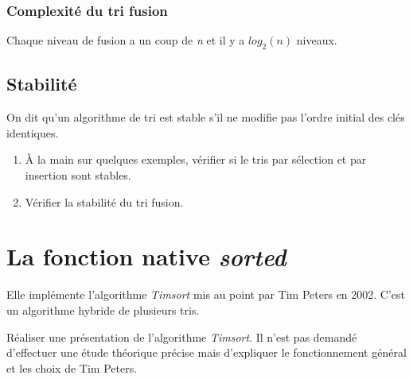 \documentclass[a4paper,11pt]{article}
\begin{document}
\begin{Form}
\begin{figure}[!h]
\end{figure}
\subsubsection{Complexité du tri fusion}
Chaque niveau de fusion a un coup de \emph{n} et il y a $log_2(n)$ niveaux.
\begin{center}
\end{center}
\subsection{Stabilité}
On dit qu'un algorithme de tri est stable s'il ne modifie pas l'ordre initial des clés identiques.
\begin{activite}
\begin{enumerate}
\item À la main sur quelques exemples, vérifier si le tris par sélection et par insertion sont stables.
\item Vérifier la stabilité du tri fusion.
\end{enumerate}
\end{activite}
\section{La fonction native \emph{sorted}}
Elle implémente l'algorithme \emph{Timsort} mis au point par Tim Peters en 2002. C'est un algorithme hybride de plusieurs tris.
\begin{activite}
Réaliser une présentation de l'algorithme \emph{Timsort}. Il n'est pas demandé d'effectuer une étude théorique précise mais d'expliquer le fonctionnement général et les choix de Tim Peters.
\end{activite}
\end{Form}
\end{document}
